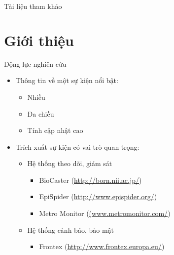 \documentclass{beamer}
\numberwithin{equation}{section}
\begin{document}

\begin{frame}{Tài liệu tham khảo}


%
\end{frame}


\section{Giới thiệu}
    \begin{frame}{Động lực nghiên cứu}
      \begin{itemize}
        \item Thông tin về một sự kiện nổi bật:
          \begin{itemize}
            \item Nhiều
              \item Đa chiều
               \item Tính cập nhật cao
            \end{itemize}
          \medskip
          \pause
        \item Trích xuất sự kiện có vai trò quan trọng:
          \begin{itemize}
            \item Hệ thống theo dõi, giám sát
              \begin{itemize}
                \item BioCaster (\href{http://born.nii.ac.jp/}{http://born.nii.ac.jp/})
                    \item EpiSpider (\href{http://www.epispider.org/}{http://www.epispider.org/})
                      \item Metro Monitor (\href{(www.metromonitor.com/}{(www.metromonitor.com/})
                \end{itemize}
              \pause
              \item Hệ thống cảnh báo, bảo mật
                \begin{itemize}
                  \item Frontex (\href{http://www.frontex.europa.eu/}{http://www.frontex.europa.eu/})
                  \end{itemize}
          \end{itemize}
        \end{itemize}
      \end{frame}
\end{document}
